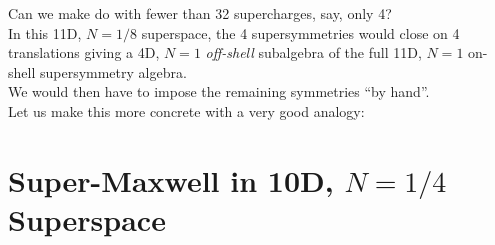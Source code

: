 \documentclass[a4paper,12pt]{article} %
\begin{document}
Can we make do with fewer than 32 supercharges, say, only 4?\\
In this 11D, $N=1/8$ superspace, the 4 supersymmetries would close on 4 translations giving a 4D, $N=1$ {\em off-shell} subalgebra of the full 11D, $N=1$ on-shell supersymmetry algebra.\\
We would then have to impose the remaining symmetries ``by hand''. \\
Let us make this more concrete with a very good analogy: 

\section{Super-Maxwell in 10D, $N=1/4$ Superspace}
\end{document}
